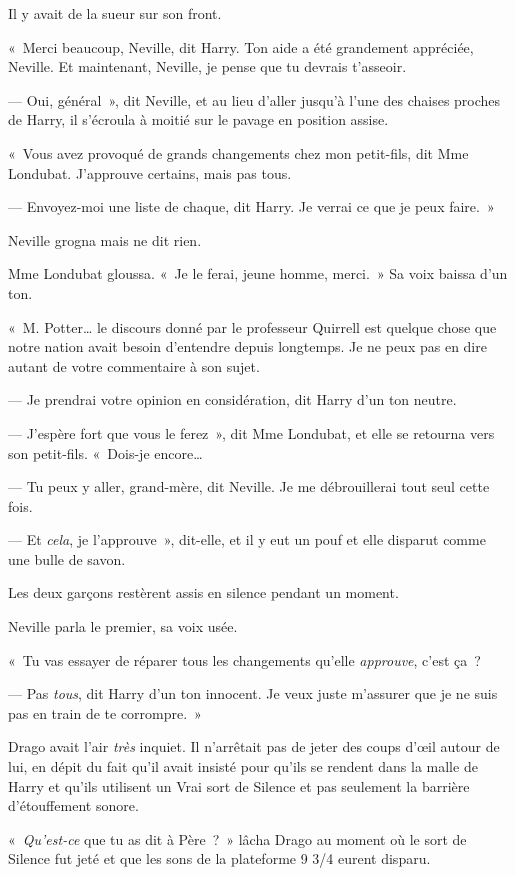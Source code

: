 Il y avait de la sueur sur son front.

«~Merci beaucoup, Neville, dit Harry.
Ton aide a été grandement appréciée, Neville.
Et maintenant, Neville, je pense que tu devrais t'asseoir.

--- Oui, général~», dit Neville, et au lieu d'aller jusqu'à l'une des chaises proches de Harry, il s'écroula à moitié sur le pavage en position assise.

«~Vous avez provoqué de grands changements chez mon petit-fils, dit Mme Londubat.
J'approuve certains, mais pas tous.

--- Envoyez-moi une liste de chaque, dit Harry.
Je verrai ce que je peux faire.~»

Neville grogna mais ne dit rien.

Mme Londubat gloussa.
«~Je le ferai, jeune homme, merci.~»
Sa voix baissa d'un ton.

«~M. Potter… le discours donné par le professeur Quirrell est quelque chose que notre nation avait besoin d'entendre depuis longtemps.
Je ne peux pas en dire autant de votre commentaire à son sujet.

--- Je prendrai votre opinion en considération, dit Harry d'un ton neutre.

--- J'espère fort que vous le ferez~», dit Mme Londubat, et elle se retourna vers son petit-fils.
«~Dois-je encore…

--- Tu peux y aller, grand-mère, dit Neville.
Je me débrouillerai tout seul cette fois.

--- Et \emph{cela}, je l'approuve~», dit-elle, et il y eut un pouf et elle disparut comme une bulle de savon.

Les deux garçons restèrent assis en silence pendant un moment.

Neville parla le premier, sa voix usée.

«~Tu vas essayer de réparer tous les changements qu'elle \emph{approuve}, c'est ça~?

--- Pas \emph{tous}, dit Harry d'un ton innocent.
Je veux juste m'assurer que je ne suis pas en train de te corrompre.~»

\later

Drago avait l'air \emph{très} inquiet.
Il n'arrêtait pas de jeter des coups d'œil autour de lui, en dépit du fait qu'il avait insisté pour qu'ils se rendent dans la malle de Harry et qu'ils utilisent un Vrai sort de Silence et pas seulement la barrière d'étouffement sonore.

«~\emph{Qu'est-ce} que tu as dit à Père~?~»
lâcha Drago au moment où le sort de Silence fut jeté et que les sons de la plateforme 9 3/4 eurent disparu.

